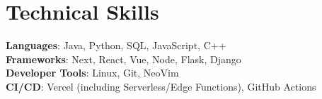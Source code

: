 \documentclass[letterpaper,11pt]{article}
\begin{document}
%
\section{Technical Skills}
 \begin{itemize}[leftmargin=0.15in, label={}]
    \small{\item{
     \textbf{Languages}{: Java, Python, SQL, JavaScript, C++ } \\
     \textbf{Frameworks}{: Next, React, Vue, Node, Flask, Django } \\
     \textbf{Developer Tools}{: Linux, Git, NeoVim } \\
     \textbf{CI/CD}{: Vercel (including Serverless/Edge Functions), GitHub Actions }
    }}
 \end{itemize}




\end{document}
